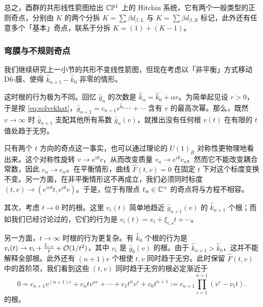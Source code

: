 总之，酉群的共形线性箭图给出 $\mathbb{C} \mathbb{P}^1$ 上的 Hitchin 系统，它有两个一般类型的正则奇点，分别由 $K$ 的两个分拆 $K = \sum \beta d_{\beta,L}$ 与 $K = \sum \beta d_{\beta,R}$ 标记，此外还有任意多个「基本」奇点，联系于分拆 $K = (1) + (K-1)$。

\subsubsection{弯膜与不规则奇点}\label{subsubsec:Brane-bending}

我们继续研究上一小节的共形不变线性箭图，但现在考虑以「非平衡」方式移动 D6-膜、使得 $\hat k_{n+1} - \hat k_0$ 非零的情形。

这时根的行为极为不同。回忆 $\hat g_{\alpha}$ 的次数是 $\hat k_\alpha = \hat k_0 + \alpha r$。为简单起见设 $r>0$，于是按 \eqref{eq:solvekhat}，$\hat g_{n+1}= c_{n+1} v^{\hat k_{n+1}} + \cdots $ 含有 $v$ 的最高次幂。那么，既然 $v\to \infty$ 时 $\hat g_{n+1}$ 支配其他所有系数 $\hat g_\alpha(v)$，就推出没有任何根 $v(t)$ 在有限的 $t$ 值处趋于无穷。

只有两个 $t$ 方向的奇点这一事实，也可以通过理论的 $U(1)_R$ 对称性更物理地看出来。这个对称性旋转 $v \to e^{i \theta} v$，从而改变质量 $v_a \to e^{i \theta} v_a$。然而它不能改变耦合常数，因此 $c_\alpha \to c_\alpha$。在平衡情形，曲线 $\hat F(t,v)=0$ 在固定 $t$ 下对这个标度变换不变。另一方面，在非平衡情形这不再成立，我们必须同时标度 $(t,v) \to (e^{i r\theta} t, e^{i \theta} v)$。于是，位于有限点 $t_\alpha\in \mathbb{C}^\times$ 的奇点将与方程不相容。

其次，考虑 $t\to 0$ 时的根。这里 $v_i(t)$ 简单地趋近 $\hat g_{n+1}(v)$ 的 $\hat k_{n+1}$ 个根；而如我们已经讨论过的，它们的行为是 $v_i(t) = v_i + \xi_{i,s} t + \cdots$。

另一方面，$t \to \infty$ 时根的行为更复杂。有 $\hat k_0$ 个根的行为是 $v_i(t) \to v_i + \frac{\xi_{i,a}}{t}+ \mathcal{O}(1/t^2)$，其中 $v_i$ 是 $\hat g_0(v)$ 的根。由于 $\hat k_{n+1} > \hat k_0$，这并不能解释全部根。此外还有 $(n+1)r$ 个根使 $t, v$ 同时趋于无穷。此时保留 $\hat F(t,v)$ 中的首阶项，我们看到这些 $(t,v)$ 同时趋于无穷的根必定渐近于
\begin{equation}\label{eq:BigRoots}
0 = c_{n+1} v^{(n+1)r} + c_n t v^{nr} + \cdots + c_1 t^n v^r + c_{0}
t^{n+1} := c_{n+1} \prod_{i=1}^{n+1} (v^r - \nu_i t).
\end{equation}
的根。


